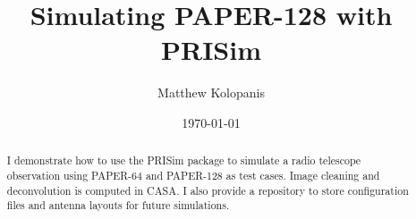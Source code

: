 \documentclass[hidelinks]{article}
\begin{document}
\title{\large \bf Simulating PAPER-128 with PRISim}




\author[1,2]{Matthew Kolopanis}
\date{\today}
\maketitle
\begin{abstract}
I demonstrate how to use the PRISim package to simulate a radio telescope observation using PAPER-64 and PAPER-128 as test cases. Image cleaning and deconvolution is computed in CASA. I also provide a repository to store configuration files and antenna layouts for future simulations.
\end{abstract}
\end{document}
